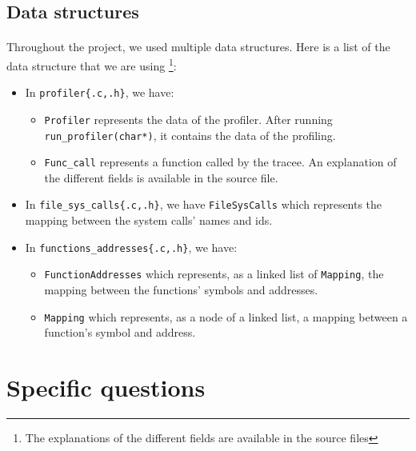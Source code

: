 \documentclass[a4paper, 11pt, oneside]{article}
\begin{document}
\subsection{Data structures}
\paragraph{}Throughout the project, we used multiple data structures. Here is a list of the data structure that we are using \footnote{The explanations of the different fields are available in the source files}:
\begin{itemize}
	\item In \texttt{profiler\{.c,.h\}}, we have:
		\begin{itemize}
			\item \texttt{Profiler} represents the data of the profiler. After running \texttt{run\_profiler(char*)}, it contains the data of the profiling.
			\item \texttt{Func\_call} represents a function called by the tracee. An explanation of the different fields is available in the source file.
		\end{itemize}
	\item In \texttt{file\_sys\_calls\{.c,.h\}}, we have \texttt{FileSysCalls} which represents the mapping between the system calls' names and ids.
	\item In \texttt{functions\_addresses\{.c,.h\}}, we have:
		\begin{itemize}
			\item \texttt{FunctionAddresses} which represents, as a linked list of \texttt{Mapping}, the mapping between the functions' symbols and addresses.
			\item \texttt{Mapping} which represents, as a node of a linked list, a mapping between a function's symbol and address.
		\end{itemize}
\end{itemize}

\section{Specific questions}
\end{document}
